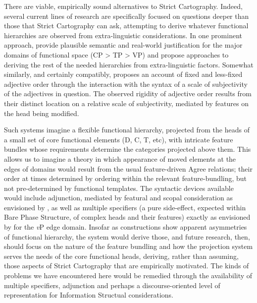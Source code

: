 \documentclass[output=paper]{langscibook}
\begin{document}
There are viable, empirically sound alternatives to Strict Cartography. Indeed, several current lines of research are specifically focused on questions deeper than those that Strict Cartography can ask, attempting to derive whatever functional hierarchies are observed from extra-linguistic considerations. In one prominent approach, \citet{ramchand2014deriving} provide plausible semantic and real-world justification for the major domains of functional space (CP > TP > VP) and propose approaches to deriving the rest of the needed hierarchies from extra-linguistic factors. Somewhat similarly, and certainly compatibly, \citet{Larson:2021} proposes an account of fixed and less-fixed adjective order through the interaction with the syntax of a scale of subjectivity of the adjectives in question. The observed rigidity of adjective order results from their distinct location on a relative scale of subjectivity, mediated by features on the head being modified.

\begin{sloppypar}
Such systems imagine a flexible functional hierarchy, projected from the heads of a small set of core functional elements (D, C, T, etc), with intricate feature bundles whose requirements determine the categories projected above them. This allows us to imagine a theory in which appearance of moved elements at the edges of domains would result from the usual feature-driven Agree relations; their order at times determined by ordering within the relevant feature-bundling, but not pre-determined by functional templates. The syntactic devices available would include adjunction, mediated by featural and scopal consideration as envisioned by \citet{Ernst2007}, as well as multiple specifiers (a pure side-effect, expected within Bare Phase Structure,  of complex heads and their features) exactly as envisioned by \citet{Chomsky2001} for the \textit{v}P edge domain. Insofar as constructions show apparent asymmetries of functional hierarchy, the system would derive those, and future research, then, should focus on the nature of the feature bundling and how the projection system serves the needs of the core functional heads, deriving, rather than assuming, those aspects of Strict Cartography that are empirically motivated. The kinds of problems we have encountered here would be remedied through the availability of multiple specifiers, adjunction and perhaps a discourse-oriented level of representation for Information Structual considerations. 
\end{sloppypar}
	
\end{document}
